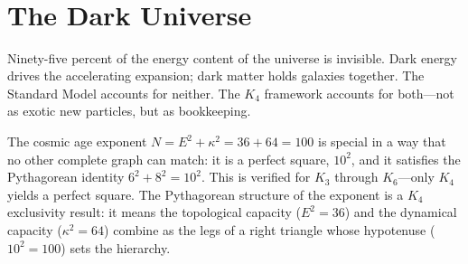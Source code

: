 \documentclass[11pt,a4paper]{book}
\begin{document}
\begin{code}
\<%
\\
\>[0]\AgdaSpace{}%
\AgdaSymbol{=}\AgdaSpace{}%
%
\>[31]\<%
\\
%
\\[\AgdaEmptyExtraSkip]%
\>[0]\AgdaSpace{}%
\AgdaSymbol{:}\AgdaSpace{}%
\<%
\\
\>[0]\AgdaSpace{}%
\AgdaSymbol{=}\AgdaSpace{}%
%
\>[32]\<%
\\
%
\\[\AgdaEmptyExtraSkip]%
\>[0]\AgdaSpace{}%
\AgdaSymbol{:}\AgdaSpace{}%
\AgdaSpace{}%
\AgdaSpace{}%
\<%
\\
\>[0]\AgdaSpace{}%
\AgdaSymbol{=}\AgdaSpace{}%
\<%
\\
%
\\[\AgdaEmptyExtraSkip]%
\>[0]\<%
\\
\>[0]\AgdaSpace{}%
\AgdaSymbol{:}\AgdaSpace{}%
\<%
\\
\>[0]\AgdaSpace{}%
\AgdaSymbol{=}\AgdaSpace{}%
\<%
\end{code}

\chapter{The Dark Universe}
\label{ch:dark-universe}

Ninety-five percent of the energy content of the universe is invisible. Dark energy drives the accelerating expansion; dark matter holds galaxies together. The Standard Model accounts for neither. The $K_4$ framework accounts for both---not as exotic new particles, but as bookkeeping.

The cosmic age exponent $N = E^2 + \kappa^2 = 36 + 64 = 100$ is special in a way that no other complete graph can match: it is a perfect square, $10^2$, and it satisfies the Pythagorean identity $6^2 + 8^2 = 10^2$. This is verified for $K_3$ through $K_6$---only $K_4$ yields a perfect square. The Pythagorean structure of the exponent is a $K_4$ exclusivity result: it means the topological capacity ($E^2 = 36$) and the dynamical capacity ($\kappa^2 = 64$) combine as the legs of a right triangle whose hypotenuse ($10^2 = 100$) sets the hierarchy.
\end{document}
